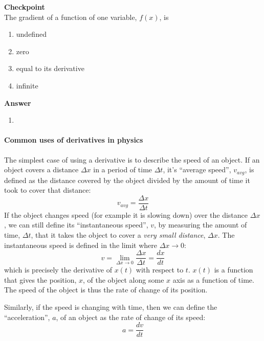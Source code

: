 \begin{framed}
\textbf{Checkpoint}\\
The gradient of a function of one variable, $f(x)$, is

\begin{enumerate}
\item undefined
\item zero
\item equal to its derivative
\item infinite
\end{enumerate}

\begin{framed}
\textbf{Answer}\\
\begin{enumerate}[resume]
\item
\end{enumerate}
\end{framed}
\end{framed}

\paragraph{Common uses of derivatives in physics}

The simplest case of using a derivative is to describe the speed of an object. If an object covers a distance $\Delta x$ in a period of time $\Delta t$, it's ``average speed'', $v_{avg}$, is defined as the distance covered by the object divided by the amount of time it took to cover that distance:
\begin{equation}
v_{avg} = \frac{\Delta x}{\Delta t}
\end{equation}
If the object changes speed (for example it is slowing down) over the distance $\Delta x$, we can still define its ``instantaneous speed'', $v$, by measuring the amount of time, $\Delta t$, that it takes the object to cover a \textit{very small distance}, $\Delta x$. The instantaneous speed is defined in the limit where $\Delta x \to 0$:
\begin{equation}
v = \lim_{\Delta x\to 0}\frac{\Delta x}{\Delta t}=\frac{dx}{dt}
\end{equation}
which is precisely the derivative of $x(t)$ with respect to $t$. $x(t)$ is a function that gives the position, $x$, of the object along some $x$ axis as a function of time. The speed of the object is thus the rate of change of its position.

Similarly, if the speed is changing with time, then we can define the ``acceleration'', $a$, of an object as the rate of change of its speed:
\begin{equation}
a = \frac{dv}{dt}
\end{equation}

